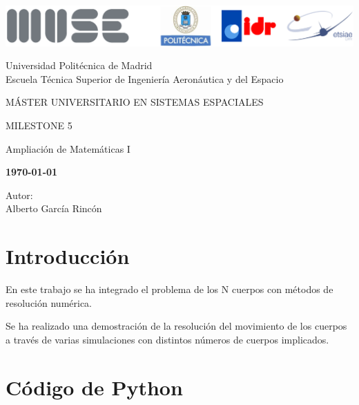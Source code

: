 \documentclass[12pt,a4paper]{article}
\begin{document}
	
\begin{titlepage}
	\centering
	\includegraphics[width=\textwidth]{FIGURES/Portada/Logo_portada.png} 
	\vspace{1.5cm}
	
	Universidad Politécnica de Madrid
	\\Escuela Técnica Superior de Ingeniería Aeronáutica y del Espacio
	\vspace{2cm}
	
	{\large MÁSTER UNIVERSITARIO EN SISTEMAS ESPACIALES}
	\vspace{2cm}
	
	{\LARGE MILESTONE 5}
	\vspace{1cm}
	
	{\large Ampliación de Matemáticas I}
	\vspace{4cm}
	
	\begin{center}
		\large{\textbf{\today}} \\
	\end{center}
	
	Autor: \\ Alberto García Rincón
	\vfill
\end{titlepage}

\newpage
\pagestyle{empty}
\tableofcontents	

\newpage
{}
\setcounter{page}{1}
\pagestyle{fancy} 

\section{Introducción}
En este trabajo se ha integrado el problema de los N cuerpos con métodos de resolución numérica. 

Se ha realizado una demostración de la resolución del movimiento de los cuerpos a través de varias simulaciones con distintos números de cuerpos implicados.


\section{Código de Python}
\end{document}
